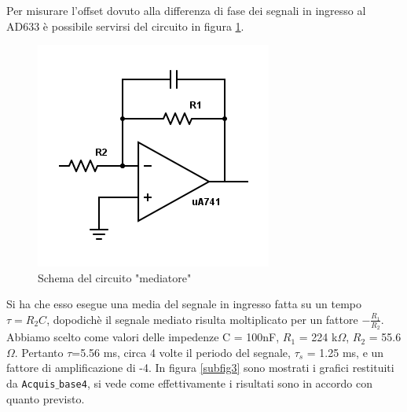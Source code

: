 \documentclass[10pt,letterpaper]{article}
\begin{document}
Per misurare l'offset dovuto alla differenza di fase dei segnali in ingresso al AD633 è possibile servirsi del circuito in figura \ref{es26}.

\begin{figure}[!h]
\centering
\includegraphics[scale=.6]{es25}
\caption{Schema del circuito "mediatore"}
\label{es26}
\end{figure}

Si ha che esso esegue una media del segnale in ingresso fatta su un tempo $\tau  = R_2C$, dopodichè il segnale mediato risulta moltiplicato per un fattore $-\frac{R_1}{R_2}$. Abbiamo scelto come valori delle impedenze C = 100nF, $R_1$ = 224 k$\Omega$, $R_2$ = 55.6 $\Omega$. Pertanto $\tau$=5.56 ms, circa 4 volte il periodo del segnale, $\tau_s$ = 1.25 ms, e un fattore di amplificazione di -4. In figura \ref{subfig3} sono mostrati i grafici restituiti da \texttt{Acquis$\_$base4}, si vede come effettivamente i risultati sono in accordo con quanto previsto.
\end{document}
